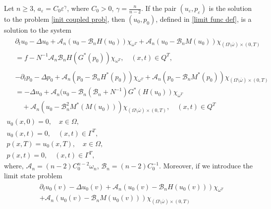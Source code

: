 \documentclass[reqno]{amsart}
\begin{document}
\begin{theorem} \label{homogenization theorem} 
Let $n\geq 3$, $a_{\varepsilon}=C_0\varepsilon ^{\gamma }$, where $C_0>0$, 
$\gamma = \frac{n}{n-2}$. If the
pair $(u_{\varepsilon },p_{\varepsilon })$ is the solution to the problem
\eqref{init coupled prob}, then $(u_0,p_0)$, defined in \eqref{limit func def}, 
is a solution to the system
\begin{equation}
\begin{gathered}
\begin{aligned}
&\partial _{t}u_0-\Delta u_0+\mathcal{A}_n(u_0-\mathcal{B}%
_nH(u_0))\chi _{\omega ^{T}}  
+\mathcal{A}_n(u_0-\mathcal{B}_nM(u_0))\chi _{(\Omega \setminus
\overline{\omega })\times (0,T)} \\
&=f-N^{-1}\mathcal{A}_n\mathcal{B}
_nH(G^{\ast }(p_0))\chi _{\omega ^{T}}, \quad (x,t)\in Q^{T},
\end{aligned} \\
\begin{aligned}
&-\partial _{t}p_0-\Delta p_0   
+\mathcal{A}_n(p_0-\mathcal{B}_nH^{\ast }(p_0))\chi _{\omega ^{T}}+%
\mathcal{A}_n(p_0-\mathcal{B}_nM^{\ast }(p_0))\chi _{(\Omega
\setminus \overline{\omega })\times (0,T)}   \\
&=-\Delta u_0+\mathcal{A}_n(u_0-\mathcal{B}_n(\mathcal{B}%
_n+N^{-1})G^{\ast }(H(u_0))\chi _{\omega ^{T}}  \\
&\quad +\mathcal{A}_n(u_0-\mathcal{B}_n^2M^{\ast }(M(u_0)))\chi _{(\Omega
\setminus \overline{\omega })\times (0,T)}, \quad  (x,t)\in Q^{T} 
\end{aligned}\\
u_0(x,0)=0, \quad x\in \Omega , \\
u_0(x,t)=0, \quad  (x,t)\in \Gamma ^{T}, \\
p(x,T)=u_0(x,T), \quad  x\in \Omega , \\
p(x,t)=0, \quad  (x,t)\in \Gamma ^{T},
\end{gathered}
\end{equation}   \label{homogenized system}
where, $\mathcal{A}_n = (n-2)C^{n-2}_0\omega_n$, $\mathcal{B}_n = (n-2)C^{-1}_0$.
 Moreover, if we introduce the limit state problem
\begin{equation}
\begin{gathered}
\begin{aligned}
&\partial _{t}u_0(v)-\Delta u_0(v)+\mathcal{A}_n(u_0(v)-\mathcal{B}%
_nH(u_0(v)))\chi _{\omega ^{T}}   \\
&+\mathcal{A}_n(u_0(v)-\mathcal{B}_nM(u_0(v)))\chi _{(\Omega
\setminus \overline{\omega })\times (0,T)} \\

\end{aligned}
\end{gathered}
\end{equation}
\end{theorem}
\end{document}
